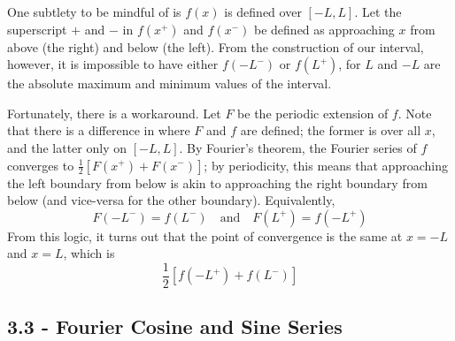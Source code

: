 \documentclass[a4paper]{article}
\begin{document}
\vspace{12pt}


One subtlety to be mindful of is \( f \!\left( x \right) \) is defined over \( \!\left[ -L,L \right] \). Let the superscript \( + \) and \( - \) in \( f \!\left( x^{+} \right) \) and \( f \!\left( x^{-} \right) \) be defined as approaching \( x \) from above (the right) and below (the left). From the construction of our interval, however, it is impossible to have either \( f \!\left( -L^{-} \right) \) or \( f \!\left( L^{+} \right) \), for \( L \) and \( -L \) are the absolute maximum and minimum values of the interval. 

Fortunately, there is a workaround. Let \( F \) be the periodic extension of \( f \). Note that there is a difference in where \( F \) and \( f \) are defined; the former is over all \( x \), and the latter only on \( \!\left[ -L,L \right] \). By Fourier's theorem, the Fourier series of \( f \) converges to \( \frac{1}{2}\!\left[ F \!\left( x^{+} \right) + F \!\left( x^{-} \right) \right] \); by periodicity, this means that approaching the left boundary from below is akin to approaching the right boundary from below (and vice-versa for the other boundary). Equivalently,
\[
	F \!\left( -L^{-} \right) = f \!\left( L^{-} \right) \quad \text{and} \quad F \!\left( L^{+} \right) = f \!\left( -L^{+} \right)
\]
From this logic, it turns out that the point of convergence is the same at \( x = -L \) and \( x = L \), which is
\[
	\frac{1}{2}\!\left[ f \!\left( -L^{+} \right) + f \!\left( L^{-} \right) \right] 
\]

\newpage
\subsection{\textsf{3.3 - Fourier Cosine and Sine Series}}

\end{document}
